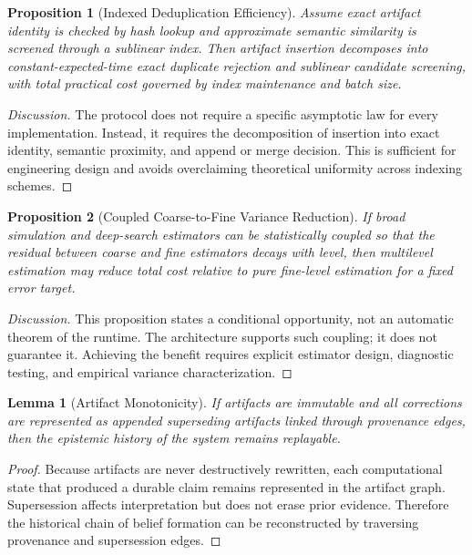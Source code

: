 \documentclass[11pt]{article}
\newtheorem{proposition}{Proposition}
\newtheorem{lemma}{Lemma}
\theoremstyle{definition}
\begin{document}
\begin{proposition}[Indexed Deduplication Efficiency]
Assume exact artifact identity is checked by hash lookup and approximate semantic similarity is screened through a sublinear index. Then artifact insertion decomposes into constant-expected-time exact duplicate rejection and sublinear candidate screening, with total practical cost governed by index maintenance and batch size.
\end{proposition}

\begin{proof}[Discussion]
The protocol does not require a specific asymptotic law for every implementation. Instead, it requires the decomposition of insertion into exact identity, semantic proximity, and append or merge decision. This is sufficient for engineering design and avoids overclaiming theoretical uniformity across indexing schemes.
\end{proof}

\begin{proposition}[Coupled Coarse-to-Fine Variance Reduction]
If broad simulation and deep-search estimators can be statistically coupled so that the residual between coarse and fine estimators decays with level, then multilevel estimation may reduce total cost relative to pure fine-level estimation for a fixed error target.
\end{proposition}

\begin{proof}[Discussion]
This proposition states a conditional opportunity, not an automatic theorem of the runtime. The architecture supports such coupling; it does not guarantee it. Achieving the benefit requires explicit estimator design, diagnostic testing, and empirical variance characterization.
\end{proof}

\begin{lemma}[Artifact Monotonicity]
If artifacts are immutable and all corrections are represented as appended superseding artifacts linked through provenance edges, then the epistemic history of the system remains replayable.
\end{lemma}

\begin{proof}
Because artifacts are never destructively rewritten, each computational state that produced a durable claim remains represented in the artifact graph. Supersession affects interpretation but does not erase prior evidence. Therefore the historical chain of belief formation can be reconstructed by traversing provenance and supersession edges.
\end{proof}
\end{document}
